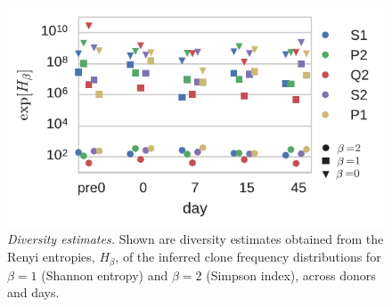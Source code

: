 \documentclass[letterpaper,english,prl,reprint,longbibliography]{revtex4-1} %
\begin{document}
\begin{figure}[ht!]
\includegraphics{fig4_div_estimates}
\centering{}
\caption{
\emph{Diversity estimates.} Shown are diversity estimates obtained from the Renyi entropies, $H_\beta$, of the inferred clone frequency distributions for $\beta=1$ (Shannon entropy) and $\beta=2$ (Simpson index), across donors and days.
\label{fig:div_estimates}}
\end{figure}


\end{document}
